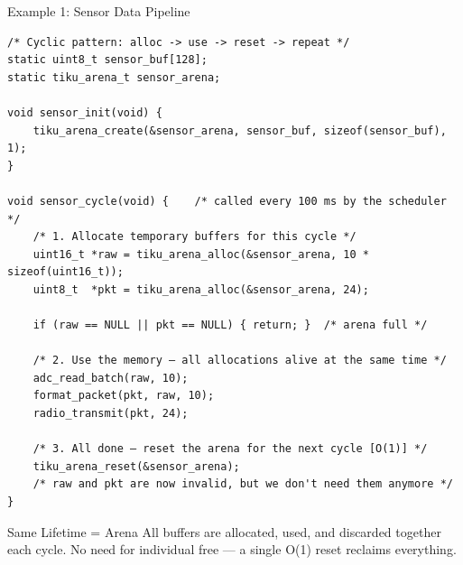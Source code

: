\documentclass[aspectratio=169, 10pt]{beamer}
\begin{document}
\begin{frame}[fragile]{Example 1: Sensor Data Pipeline}
\begin{lstlisting}[style=cstyle]
/* Cyclic pattern: alloc -> use -> reset -> repeat */
static uint8_t sensor_buf[128];
static tiku_arena_t sensor_arena;

void sensor_init(void) {
    tiku_arena_create(&sensor_arena, sensor_buf, sizeof(sensor_buf), 1);
}

void sensor_cycle(void) {    /* called every 100 ms by the scheduler */
    /* 1. Allocate temporary buffers for this cycle */
    uint16_t *raw = tiku_arena_alloc(&sensor_arena, 10 * sizeof(uint16_t));
    uint8_t  *pkt = tiku_arena_alloc(&sensor_arena, 24);

    if (raw == NULL || pkt == NULL) { return; }  /* arena full */

    /* 2. Use the memory — all allocations alive at the same time */
    adc_read_batch(raw, 10);
    format_packet(pkt, raw, 10);
    radio_transmit(pkt, 24);

    /* 3. All done — reset the arena for the next cycle [O(1)] */
    tiku_arena_reset(&sensor_arena);
    /* raw and pkt are now invalid, but we don't need them anymore */
}
\end{lstlisting}

\begin{block}{Same Lifetime = Arena}
All buffers are allocated, used, and discarded together each cycle.
No need for individual free --- a single O(1) reset reclaims everything.
\end{block}
\end{frame}
\end{document}
